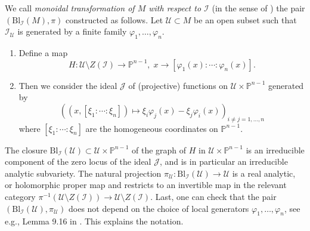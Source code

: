 \documentclass[10pt]{article}
\theoremstyle{plain}
\theoremstyle{definition}
\theoremstyle{remark}
\begin{document}
We call \emph{monoidal transformation of $M$ with respect to $ \mathcal I$} (in the sense of \cite{Hironaka-Rossi}) 
the pair $ (\mathrm{Bl}_\mathcal I (M),\pi)$ constructed as follows.
Let $ \mathcal U \subset M$ be an open subset such that $ \mathcal I_\mathcal U$ is generated by a finite family $ \varphi_1, \dots, \varphi_n$.
\begin{enumerate}
    \item Define a map $$H\colon \mathcal{U}\setminus Z(\mathcal I) \longrightarrow \mathbb P^{n-1}, \;x\to [\varphi_1(x)\colon\cdots \colon \varphi_n(x)].$$

    \item Then we  consider the ideal $\mathcal{J}$ of (projective) functions on $ \mathcal U\times \mathbb P^{n-1}$ generated by  $$\left(\left(x, [\xi_1\colon\cdots\colon \xi_n] \right)\mapsto \xi_i\varphi_j(x)-\xi_j\varphi_i(x)\right)_{i\neq j=1,\ldots,n}$$  where $[\xi_1\colon\cdots\colon \xi_n]$ are the homogeneous coordinates on $\mathbb P^{n-1}$.
\end{enumerate}
The closure $\mathrm{Bl}_\mathcal I(\mathcal{U})\subset  \mathcal U\times \mathbb P^{n-1}$ of the graph of $H$ in  $ \mathcal U\times \mathbb P^{n-1}$ is an irreducible component of the zero locus of the ideal $\mathcal{J}$, and is in particular an irreducible analytic subvariety.  
The natural projection $ \pi_\mathcal U: \mathrm{Bl}_\mathcal I(\mathcal{U}) \to \mathcal U$ is  a real analytic, or holomorphic proper map and restricts to an invertible map in the relevant category $ \pi^{-1}(  \mathcal{U}\setminus Z(\mathcal I)) \to \mathcal{U}\setminus Z(\mathcal I)$. 
Last, one can check that the pair $\left(\mathrm{Bl}_{\mathcal I}(\mathcal{U}),\pi_\mathcal U\right)$ does not depend on the choice of local generators $ \varphi_1, \dots, \varphi_n$, see e.g., Lemma 9.16 in \cite{Gathmann}. This explains the notation. 
\end{document}
